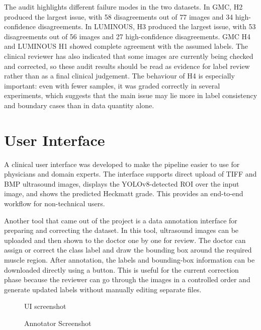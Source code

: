 The audit highlights different failure modes in the two datasets. In GMC, H2 produced the largest issue, with 58 disagreements out of 77 images and 34 high-confidence disagreements. In LUMINOUS, H3 produced the largest issue, with 53 disagreements out of 56 images and 27 high-confidence disagreements. GMC H4 and LUMINOUS H1 showed complete agreement with the assumed labels. The clinical reviewer has also indicated that some images are currently being checked and corrected, so these audit results should be read as evidence for label review rather than as a final clinical judgement. The behaviour of H4 is especially important: even with fewer samples, it was graded correctly in several experiments, which suggests that the main issue may lie more in label consistency and boundary cases than in data quantity alone.

\section{User Interface}
A clinical user interface was developed to make the pipeline easier to use for physicians and domain experts. The interface supports direct upload of TIFF and BMP ultrasound images, displays the YOLOv8-detected ROI over the input image, and shows the predicted Heckmatt grade. This provides an end-to-end workflow for non-technical users.

Another tool that came out of the project is a data annotation interface for preparing and correcting the dataset. In this tool, ultrasound images can be uploaded and then shown to the doctor one by one for review. The doctor can assign or correct the class label and draw the bounding box around the required muscle region. After annotation, the labels and bounding-box information can be downloaded directly using a button. This is useful for the current correction phase because the reviewer can go through the images in a controlled order and generate updated labels without manually editing separate files.

\begin{figure}[H]
    \centering
    \caption{UI screenshot}
    \label{fig:ui}
\end{figure}

\begin{figure}[H]
    \centering
    \caption{Annotator Screenshot}
    \label{fig:annotation_ui}
\end{figure}

